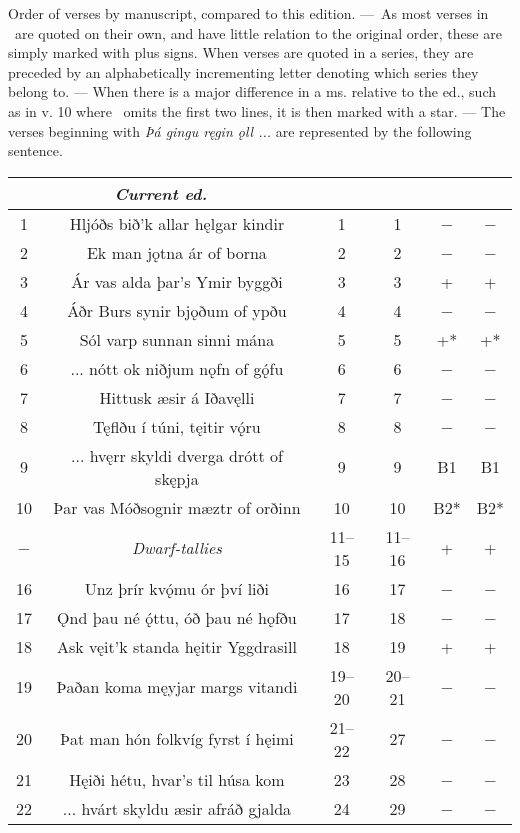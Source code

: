 {Order of verses by manuscript, compared to this edition. — As most verses in \GylfMS\ are quoted on their own, and have little relation to the original order, these are simply marked with plus signs. When verses are quoted in a series, they are preceded by an alphabetically incrementing letter denoting which series they belong to. — When there is a major difference in a ms. relative to the ed., such as in v. 10 where \GylfMS\ omits the first two lines, it is then marked with a star. — The verses beginning with \emph{Þá gingu ręgin ǫll ...} are represented by the following sentence.
\begin{longtable}{|c c c c c c|}
	\hline
	\multicolumn{2}{|c}{\emph{Current ed.}} & \Regius & \Hauksbok & \RegiusProse\Trajectinus\Wormianus & \Upsaliensis \\ [0.5ex]
	\hline\hline
	1 & Hljóðs bið’k allar hęlgar kindir & 1 & 1 & − & − \\
	2 & Ek man jǫtna ár of borna & 2 & 2 & − & − \\
	3 & Ár vas alda þar’s Ymir byggði & 3 & 3 & + & + \\
	4 & Áðr Burs synir bjǫðum of ypðu & 4 & 4 & − & − \\
	5 & Sól varp sunnan sinni mána & 5 & 5 & +* & +* \\
	6 & ... nótt ok niðjum nǫfn of gǫ́fu & 6 & 6 & − & − \\
	7 & Hittusk æsir á Iðavęlli & 7 & 7 & − & − \\
	8 & Tęflðu í túni, tęitir vǫ́ru & 8 & 8 & − & − \\
	9 & ... hvęrr skyldi dverga drótt of skępja & 9 & 9 & B1 & B1 \\
	10 & Þar vas Móðsognir mæztr of orðinn & 10 & 10 & B2* & B2* \\
	− & \emph{Dwarf-tallies} & 11–15 & 11–16 & + & + \\
	16 & Unz þrír kvǫ́mu ór því liði & 16 & 17 & − & − \\
	17 & Ǫnd þau né ǫ́ttu, óð þau né hǫfðu & 17 & 18 & − & − \\
	18 & Ask vęit’k standa hęitir Yggdrasill & 18 & 19 & + & + \\
	19 & Þaðan koma męyjar margs vitandi & 19–20 & 20–21 & − & − \\
	20 & Þat man hón folkvíg fyrst í hęimi & 21–22 & 27 & − & − \\
	21 & Hęiði hétu, hvar’s til húsa kom & 23 & 28 & − & − \\
	22 & ... hvárt skyldu æsir afráð gjalda & 24 & 29 & − & − \\

\end{longtable}}
